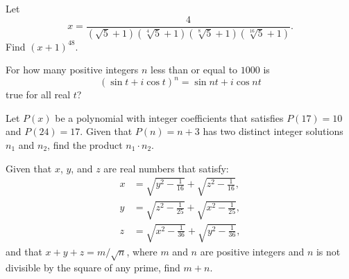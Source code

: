 %	









\begin{question}[name={2005 AIME II, \href{https://artofproblemsolving.com/community/c4p368275}{Problem 7}}]
	Let\[x=\frac{4}{(\sqrt{5}+1)(\sqrt[4]{5}+1)(\sqrt[8]{5}+1)(\sqrt[16]{5}+1)}.\]Find $(x+1)^{48}$.
\end{question}


%	










\begin{question}[name={2005 AIME II, \href{https://artofproblemsolving.com/community/c4p368277}{Problem 9}}]
	For how many positive integers $n$ less than or equal to $1000$ is\[(\sin t + i \cos t)^n=\sin nt + i \cos nt\]true for all real $t$?
\end{question}


%	









\begin{question}[name={2005 AIME II, \href{https://artofproblemsolving.com/community/c4p368300}{Problem 13}}]
	Let $P(x)$ be a polynomial with integer coefficients that satisfies $P(17)=10$ and $P(24)=17$. Given that $P(n)=n+3$ has two distinct integer solutions $n_1$ and $n_2$, find the product $n_1\cdot n_2$.
\end{question}


%	







\begin{question}[name={2006 AIME II, \href{https://artofproblemsolving.com/community/c4p464691}{Problem 15}}]
	Given that $x$, $y$, and $z$ are real numbers that satisfy:
	\begin{align*}
		x &= \sqrt{y^2-\frac{1}{16}}+\sqrt{z^2-\frac{1}{16}},\\
		y &= \sqrt{z^2-\frac{1}{25}}+\sqrt{x^2-\frac{1}{25}},\\
		z &= \sqrt{x^2-\frac{1}{36}}+\sqrt{y^2-\frac{1}{36}},
	\end{align*}
	and that $x+y+z={m}/{\sqrt{n}}$, where $m$ and $n$ are positive integers and $n$ is not divisible by the square of any prime, find $m+n$.
\end{question}


